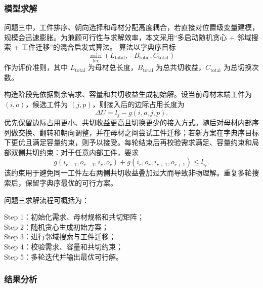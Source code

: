 \documentclass[UTF8]{ctexart}
\begin{document}
\subsubsection{模型求解}
问题三中，工件排序、朝向选择和母材分配高度耦合，若直接对位置级变量建模，规模会迅速膨胀。为兼顾可行性与求解效率，本文采用“多启动随机贪心 + 邻域搜索 + 工件迁移”的混合启发式算法。
算法以字典序目标
\begin{equation*}
\min_{\mathrm{lex}}\left(
L_{\mathrm{total}},
-B_{\mathrm{total}},
C_{\mathrm{total}}
\right)
\end{equation*}
作为评价准则，其中 $L_{\mathrm{total}}$ 为母材总长度，$B_{\mathrm{total}}$ 为总共切收益，$C_{\mathrm{total}}$ 为总切换次数。

构造阶段先依据剩余需求、容量和共切收益生成初始解。设当前母材末端工件为 $(i,o)$，候选工件为 $(j,p)$，则接入后的边际占用长度为
\begin{equation*}
\Delta U=l_j-g(i,o,j,p).
\end{equation*}
优先保留边际占用更小、共切收益更高且切换更少的接入方式。随后对母材内部序列做交换、翻转和朝向调整，并在母材之间尝试工件迁移；若新方案在字典序目标下更优且满足容量约束，则予以接受。每轮结束后再校验需求满足、容量约束和局部双侧共切约束：对于任意内部工件，要求
\begin{equation*}
g(i_{r-1},o_{r-1},i_r,o_r)
+
g(i_r,o_r,i_{r+1},o_{r+1})
\leq l_{i_r}.
\end{equation*}
该约束用于避免同一工件左右两侧共切收益叠加过大而导致非物理解。重复多轮搜索后，保留字典序最优的可行方案。

问题三求解流程可概括为：
\begin{flushleft}
Step 1：初始化需求、母材规格和共切矩阵；\\
Step 2：随机贪心生成初始方案；\\
Step 3：进行邻域搜索与工件迁移；\\
Step 4：校验需求、容量和共切约束；\\
Step 5：多轮迭代并输出最优可行解。
\end{flushleft}

\subsubsection{结果分析}
\end{document}
